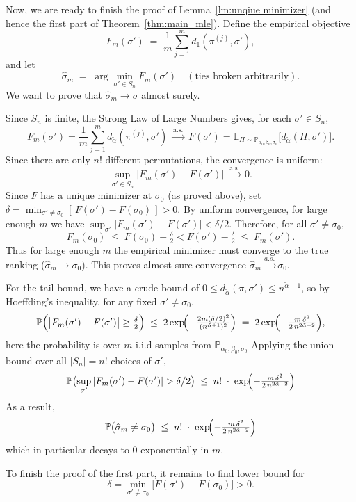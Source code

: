 \documentclass{article}
\renewcommand{\P}{\mathbb{P}}
\begin{document}
Now, we are ready to finish the proof of Lemma~\ref{lm:unqiue minimizer} (and hence the first part of Theorem~\ref{thm:main_mle}).
 Define the empirical objective
\[
F_m(\sigma')
\;=\;
\frac{1}{m}\sum_{j=1}^m d_1(\pi^{(j)},\sigma'),
\]
and let
\[
\hat\sigma_m
\;=\;
\arg\min_{\sigma'\in S_n}F_m(\sigma')
\quad(\text{ties broken arbitrarily}).
\]
We want to prove that $\hat\sigma_m\to\sigma$ almost surely.

Since $S_n$ is finite, the Strong Law of Large Numbers gives, for each $\sigma'\in S_n$,
\[
F_m(\sigma')
=\frac1m\sum_{j=1}^m d_{\tilde\alpha}(\pi^{(j)},\sigma')
\;\xrightarrow[]{\mathrm{a.s.}}\;
F(\sigma')
=\mathbb{E}_{\Pi\sim\P_{\alpha_0,\beta_0,\sigma_0}}\bigl[d_{\tilde \alpha}(\Pi,\sigma')\bigr].
\]
Since there are only $n!$ different permutations, the convergence is uniform:
\[
\sup_{\sigma'\in S_n}\bigl|F_m(\sigma')-F(\sigma')\bigr|
\;\xrightarrow[]{\mathrm{a.s.}}\;0.
\]
Since $F$ has a unique minimizer at $\sigma_0$ (as proved above), set
\(
\delta=\min_{\sigma'\neq\sigma_0}[\,F(\sigma')-F(\sigma_0)\,]>0.
\)
By uniform convergence, for large enough $m$ we have
\(\sup_{\sigma'}|F_m(\sigma')-F(\sigma')|<\delta/2\). Therefore, for all $\sigma'\neq\sigma_0$,
\[
F_m(\sigma_0)
\;\le\;
F(\sigma_0)+\tfrac\delta2< F(\sigma')-\tfrac\delta2
\;\le\;
F_m(\sigma').
\]
Thus for large enough $m$ the empirical minimizer must converge to the true ranking
($\hat\sigma_m\to\sigma_0$).  This proves almost sure convergence $\hat\sigma_m\overset{a.s.} \to \sigma_0$. 

For the tail bound, we have a crude bound of $0\le d_{\tilde\alpha}(\pi,\sigma')\le n^{\tilde \alpha+1}$, so by Hoeffding’s inequality, for any fixed $\sigma'\neq\sigma_0$,
\[
\P\Bigl(\bigl|F_m(\sigma')-F(\sigma')\bigr|\ge \tfrac\delta2\Bigr)
\;\le\;
2\exp\!\Bigl(-\tfrac{2m(\delta/2)^2}{(n^{\tilde\alpha+1})^2}\Bigr)
\;=\;
2\exp\!\Bigl(-\tfrac{m\,\delta^2}{2\,n^{2\tilde\alpha+2}}\Bigr),
\]
here the probability is over $m$ i.i.d samples from $\P_{\alpha_0,\beta_0,\sigma_0}$
Applying the union bound over all $|S_n|=n!$ choices of $\sigma'$,
\[
\P\bigl(\sup_{\sigma'}|F_m(\sigma')-F(\sigma')|>\delta/2\bigr)
\;\le\;
n!\;\cdot\;\exp\!\Bigl(-\tfrac{m\,\delta^2}{2\,n^{2\tilde\alpha+2}}\Bigr)
\]
As a result,
\[
\P\bigl(\hat\sigma_m\neq\sigma_0\bigr)
\;\le\;
n!\;\cdot\;\exp\!\Bigl(-\tfrac{m\,\delta^2}{2\,n^{2\tilde\alpha+2}}\Bigr)
\]
which in particular decays to $0$ exponentially in $m$. 

To finish the proof of the first part, it remains to find lower bound for
\[
\delta = \min_{\sigma' \neq \sigma_0} \big[ F(\sigma') - F(\sigma_0) \big] > 0.
\]
\end{document}
